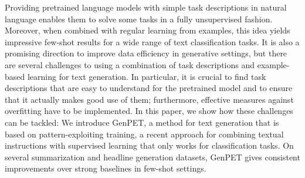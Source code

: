 Providing pretrained language models with simple task descriptions in natural language enables them to solve some tasks in a fully unsupervised fashion. Moreover, when combined with regular learning from examples, this idea yields impressive few-shot results for a wide range of text classification tasks. It is also a promising direction to improve data efficiency in generative settings, but there are several challenges to using a combination of task descriptions and example-based learning for text generation. In particular, it is crucial to find task descriptions that are easy to understand for the pretrained model and to ensure that it actually makes good use of them; furthermore, effective measures against overfitting have to be implemented. In this paper, we show how these challenges can be tackled: We introduce GenPET, a method for text generation that is based on pattern-exploiting training, a recent approach for combining textual instructions with supervised learning that only works for classification tasks. On several summarization and headline generation datasets, GenPET gives consistent improvements over strong baselines in few-shot settings.
